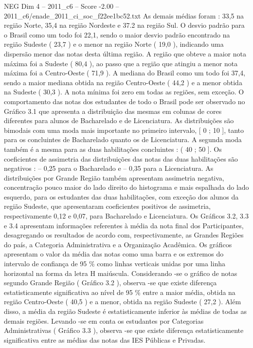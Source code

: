 \begin{textsample}{NEG Dim 4 – 2011\_c6 – Score -2.00 – 2011\_c6/enade\_2011\_ci\_soc\_f22ee1bc52.txt}
As demais médias foram : 33,5 na região Norte, 35,4 na região Nordeste e 37.2 na região Sul.
O desvio padrão para o Brasil como um todo foi 22,1, sendo o maior desvio padrão encontrado na região Sudeste ( 23,7 ) e o menor na região Norte ( 19,0 ), indicando uma dispersão menor das notas desta última região.
A região que obteve a maior nota máxima foi a Sudeste ( 80,4 ), ao passo que a região que atingiu a menor nota máxima foi a Centro-Oeste ( 71,9 ).
A mediana do Brasil como um todo foi 37,4, sendo a maior mediana obtida na região Centro-Oeste ( 44,2 ) e a menor obtida na Sudeste ( 30,3 ).
A nota mínima foi zero em todas as regiões, sem exceção.
O comportamento das notas dos estudantes de todo o Brasil pode ser observado no Gráfico 3.1 que apresenta a distribuição das mesmas em colunas de cores diferentes para alunos de Bacharelado e de Licenciatura.
As distribuições são bimodais com uma moda mais importante no primeiro intervalo, [ 0 ; 10 ], tanto para os concluintes de Bacharelado quanto os de Licenciatura.
A segunda moda também é a mesma para as duas habilitações concluintes : ( 40 ; 50 ].
Os coeficientes de assimetria das distribuições das notas das duas habilitações são negativos : – 0,25 para o Bacharelado e – 0,35 para a Licenciatura.
As distribuições por Grande Região também apresentam assimetria negativa, concentração pouco maior do lado direito do histograma e mais espalhada do lado esquerdo, para os estudantes das duas habilitações, com exceção dos alunos da região Sudeste, que apresentaram coeficientes positivos de assimetria, respectivamente 0,12 e 0,07, para Bacharelado e Licenciatura.
Os Gráficos 3.2, 3.3 e 3.4 apresentam informações referentes à média da nota final dos Participantes, desagregando os resultados de acordo com, respectivamente, as Grandes Regiões do país, a Categoria Administrativa e a Organização Acadêmica.
Os gráficos apresentam o valor da média das notas como uma barra e os extremos do intervalo de confiança de 95 \% como linhas verticais unidas por uma linha horizontal na forma da letra H maiúscula.
Considerando -se o gráfico de notas segundo Grande Região ( Gráfico 3.2 ), observa -se que existe diferença estatisticamente significativa ao nível de 95 \% entre a maior média, obtida na região Centro-Oeste ( 40,5 ) e a menor, obtida na região Sudeste ( 27,2 ).
Além disso, a média da região Sudeste é estatisticamente inferior às médias de todas as demais regiões.
Levando -se em conta os estudantes por Categorias Administrativas ( Gráfico 3.3 ), observa -se que existe diferença estatisticamente significativa entre as médias das notas das IES Públicas e Privadas.

\end{textsample}
